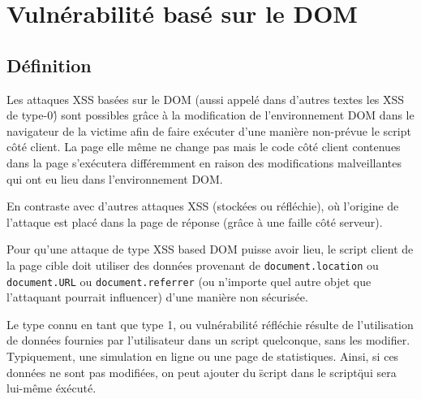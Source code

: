 \documentclass[a4paper,12pt]{report}
\begin{document}
\section{Vulnérabilité basé sur le DOM}
  \subsection{Définition} %
  \label{sub:d_finition}
  Les attaques XSS basées sur le DOM (aussi appelé dans d'autres textes les \'XSS de type-0\') sont possibles grâce à la modification de l'environnement DOM dans le navigateur de la victime afin de faire exécuter d'une manière non-prévue le script côté client. La page elle même ne change pas mais le code côté client contenues dans la page s'exécutera différemment en raison des modifications malveillantes qui ont eu lieu dans l'environnement DOM.

  En contraste avec d'autres attaques XSS (stockées ou réfléchie), où l'origine de l'attaque est placé dans la page de réponse (grâce à une faille côté serveur).

  Pour qu'une attaque de type XSS based DOM puisse avoir lieu, le script client de la page cible doit utiliser des données provenant de \lstinline{document.location} ou \lstinline{document.URL} ou \lstinline{document.referrer} (ou n'importe quel autre objet que l'attaquant pourrait influencer) d'une manière non sécurisée.

  Le type connu en tant que type 1, ou vulnérabilité réfléchie résulte de l'utilisation de données fournies par l'utilisateur dans un script quelconque, sans les modifier. Typiquement, une simulation en ligne ou une page de statistiques. Ainsi, si ces données ne sont pas modifiées, on peut ajouter du \"script dans le script\" qui sera lui-même éxécuté.
\end{document}
